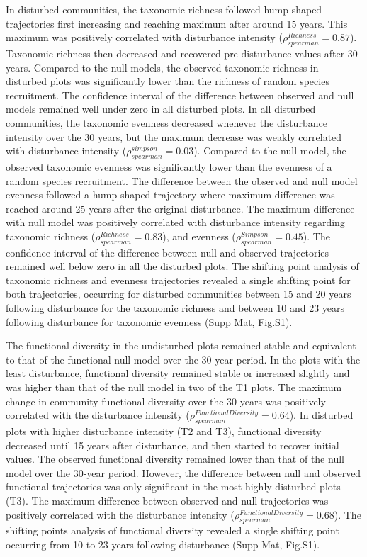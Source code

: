 \documentclass[fleqn,10pt]{ArtEcoFoG} %
\begin{document}
In disturbed communities, the taxonomic richness followed hump-shaped trajectories first increasing and reaching maximum after around 15 years. This maximum was positively correlated with disturbance intensity (\(\rho^{Richness}_{spearman}=0.87\)).
Taxonomic richness then decreased and recovered pre-disturbance values after 30 years.
Compared to the null models, the observed taxonomic richness in disturbed plots was significantly lower than the richness of random species recruitment. The confidence interval of the difference between observed and null models remained well under zero in all disturbed plots.
In all disturbed communities, the taxonomic evenness decreased whenever the disturbance intensity over the 30 years, but the maximum decrease was weakly correlated with disturbance intensity (\(\rho^{simpson}_{spearman}=0.03\)).
Compared to the null model, the observed taxonomic evenness was significantly lower than the evenness of a random species recruitment. The difference between the observed and null model evenness followed a hump-shaped trajectory where maximum difference was reached around 25 years after the original disturbance. The maximum difference with null model was positively correlated with disturbance intensity regarding taxonomic richness (\(\rho^{Richness}_{spearman}=0.83\)), and evenness (\(\rho^{Simpson}_{spearman}=0.45\)).
The confidence interval of the difference between null and observed trajectories remained well below zero in all the disturbed plots.
The shifting point analysis of taxonomic richness and evenness trajectories revealed a single shifting point for both trajectories, occurring for disturbed communities between 15 and 20 years following disturbance for the taxonomic richness and between 10 and 23 years following disturbance for taxonomic evenness (Supp Mat, Fig.S1).

The functional diversity in the undisturbed plots remained stable and equivalent to that of the functional null model over the 30-year period. In the plots with the least disturbance, functional diversity remained stable or increased slightly and was higher than that of the null model in two of the T1 plots.
The maximum change in community functional diversity over the 30 years was positively correlated with the disturbance intensity (\(\rho^{FunctionalDiversity}_{spearman}=0.64\)).
In disturbed plots with higher disturbance intensity (T2 and T3), functional diversity decreased until 15 years after disturbance, and then started to recover initial values. The observed functional diversity remained lower than that of the null model over the 30-year period.
However, the difference between null and observed functional trajectories was only significant in the most highly disturbed plots (T3). The maximum difference between observed and null trajectories was positively correlated with the disturbance intensity (\(\rho^{FunctionalDiversity}_{spearman}=0.68\)).
The shifting points analysis of functional diversity revealed a single shifting point occurring from 10 to 23 years following disturbance (Supp Mat, Fig.S1).
\end{document}
